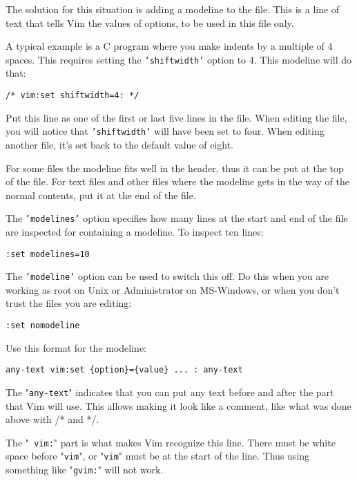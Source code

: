 {The solution for this situation is adding a modeline to the file.
This is a line of text that tells Vim the values of options, to be used in this file only.

A typical example is a C program where you make indents by a multiple of 4 spaces.
This requires setting the \texttt{'shiftwidth'} option to 4.
This modeline will do that:

\begin{Verbatim}[samepage=true]
    /* vim:set shiftwidth=4: */ 
\end{Verbatim}

Put this line as one of the first or last five lines in the file.
When editing the file, you will notice that \texttt{'shiftwidth'} will have been set to four.
When editing another file, it's set back to the default value of eight.

For some files the modeline fits well in the header, thus it can be put at the top of the file.
For text files and other files where the modeline gets in the way of the normal contents, put it at the end of the file.

The \texttt{'modelines'} option specifies how many lines at the start and end of the file are inspected for containing a modeline.
To inspect ten lines:

\begin{Verbatim}[samepage=true]
 :set modelines=10
\end{Verbatim}

The \texttt{'modeline'} option can be used to switch this off.
Do this when you are working as root on Unix or Administrator on MS-Windows, or when you don't trust the files you are editing:

\begin{Verbatim}[samepage=true]
 :set nomodeline
\end{Verbatim}

Use this format for the modeline:

\begin{Verbatim}[samepage=true]
    any-text vim:set {option}={value} ... : any-text 
\end{Verbatim}

The "\texttt{any-text}" indicates that you can put any text before and after the part that Vim will use.
This allows making it look like a comment, like what was done above with /* and */.

The "\texttt{ vim:}" part is what makes Vim recognize this line.
There must be white space before "\texttt{vim}", or "\texttt{vim}" must be at the start of the line.
Thus using something like "\texttt{gvim:}" will not work.

}
